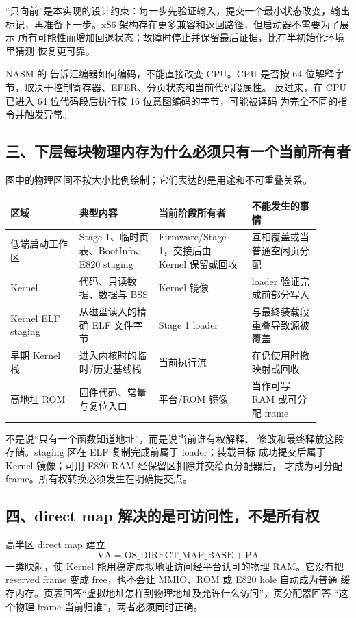 “只向前”是本实现的设计约束：每一步先验证输入，提交一个最小状态改变，输出
标记，再准备下一步。x86 架构存在更多兼容和返回路径，但启动器不需要为了展示
所有可能性而增加回退状态；故障时停止并保留最后证据，比在半初始化环境里猜测
恢复更可靠。

%
NASM 的  告诉汇编器如何编码，不能直接改变 CPU。CPU
是否按 64 位解释字节，取决于控制寄存器、EFER、分页状态和当前代码段属性。
反过来，在 CPU 已进入 64 位代码段后执行按 16 位意图编码的字节，可能被译码
为完全不同的指令并触发异常。

\subsection{三、下层每块物理内存为什么必须只有一个当前所有者}

图中的物理区间不按大小比例绘制；它们表达的是用途和不可重叠关系。

\begin{longtable}{L{0.20\linewidth}L{0.23\linewidth}L{0.27\linewidth}L{0.20\linewidth}}
\toprule
区域 & 典型内容 & 当前阶段所有者 & 不能发生的事情 \\
\midrule
低端启动工作区 & Stage 1、临时页表、BootInfo、E820 staging & Firmware/Stage 1，交接后由 Kernel 保留或回收 & 互相覆盖或当普通空闲页分配 \\
Kernel  & 代码、只读数据、数据与 BSS & Kernel 镜像 & loader 验证完成前部分写入 \\
Kernel ELF staging & 从磁盘读入的精确 ELF 文件字节 & Stage 1 loader & 与最终装载段重叠导致源被覆盖 \\
早期 Kernel 栈 & 进入内核时的临时/历史基线栈 & 当前执行流 & 在仍使用时撤映射或回收 \\
高地址 ROM & 固件代码、常量与复位入口 & 平台/ROM 镜像 & 当作可写 RAM 或可分配 frame \\
\bottomrule
\end{longtable}

不是说“只有一个函数知道地址”，而是说当前谁有权解释、
修改和最终释放这段存储。staging 区在 ELF 复制完成前属于 loader；装载目标
成功提交后属于 Kernel 镜像；可用 E820 RAM 经保留区扣除并交给页分配器后，
才成为可分配 frame。所有权转换必须发生在明确提交点。

\subsection{四、direct map 解决的是可访问性，不是所有权}

高半区 direct map 建立
\[
\mathrm{VA}=\mathrm{OS\_DIRECT\_MAP\_BASE}+\mathrm{PA}
\]
一类映射，使 Kernel 能用稳定虚拟地址访问经平台认可的物理 RAM。它没有把
reserved frame 变成 free，也不会让 MMIO、ROM 或 E820 hole 自动成为普通
缓存内存。页表回答“虚拟地址怎样到物理地址及允许什么访问”，页分配器回答
“这个物理 frame 当前归谁”，两者必须同时正确。

